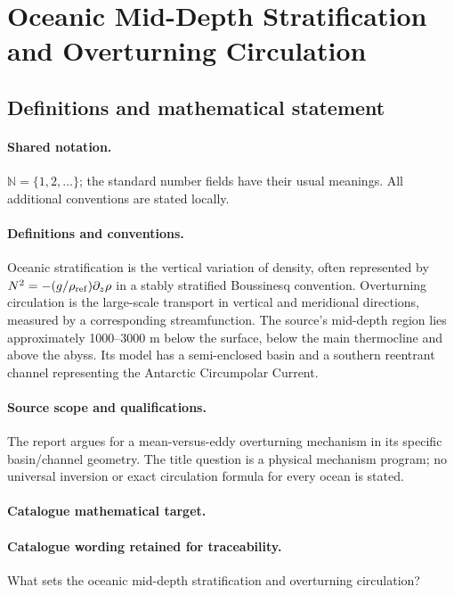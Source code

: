 \documentclass[11pt]{article}
\begin{document}
\section{Oceanic Mid-Depth Stratification and Overturning Circulation}\label{statement}

\subsection{Definitions and mathematical statement}

\paragraph{Shared notation.}$\mathbb N=\{1,2,\ldots\}$; the standard number fields have their usual meanings. All additional conventions are stated locally.


\paragraph{Definitions and conventions.} Oceanic stratification is the vertical variation of density, often represented by $N^2=-(g/\rho_{\rm ref})\partial_z\rho$ in a stably stratified Boussinesq convention. Overturning circulation is the large-scale transport in vertical and meridional directions, measured by a corresponding streamfunction. The source's mid-depth region lies approximately 1000--3000 m below the surface, below the main thermocline and above the abyss. Its model has a semi-enclosed basin and a southern reentrant channel representing the Antarctic Circumpolar Current.

\paragraph{Source scope and qualifications.} The report argues for a mean-versus-eddy overturning mechanism in its specific basin/channel geometry. The title question is a physical mechanism program; no universal inversion or exact circulation formula for every ocean is stated.

\paragraph{Catalogue mathematical target.}
\paragraph{Catalogue wording retained for traceability.}
What sets the oceanic mid-depth stratification and overturning circulation?
\end{document}
